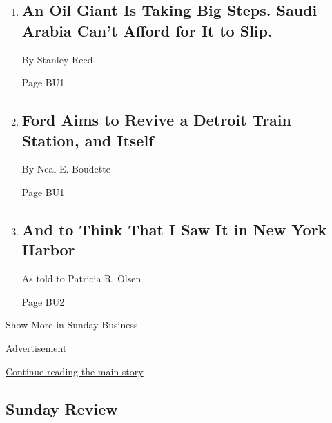 \begin{enumerate}
\def\labelenumi{\arabic{enumi}.}
\item
  \href{/2018/06/16/business/energy-environment/saudi-arabia-aramco.html}{}

  \hypertarget{an-oil-giant-is-taking-big-steps-saudi-arabia-cant-afford-for-it-to-slip}{%
  \subsection{An Oil Giant Is Taking Big Steps. Saudi Arabia Can't
  Afford for It to
  Slip.}\label{an-oil-giant-is-taking-big-steps-saudi-arabia-cant-afford-for-it-to-slip}}

  By Stanley Reed

  Page BU1
\item
  \href{/2018/06/17/business/ford-detroit-station.html}{}

  \hypertarget{ford-aims-to-revive-a-detroit-train-station-and-itself-1}{%
  \subsection{Ford Aims to Revive a Detroit Train Station, and
  Itself}\label{ford-aims-to-revive-a-detroit-train-station-and-itself-1}}

  By Neal E. Boudette

  Page BU1
\item
  \href{/2018/06/15/business/jacobs-diver-new-york.html}{}

  \hypertarget{and-to-think-that-i-saw-it-in-new-york-harbor}{%
  \subsection{And to Think That I Saw It in New York
  Harbor}\label{and-to-think-that-i-saw-it-in-new-york-harbor}}

  As told to Patricia R. Olsen

  Page BU2
\end{enumerate}

Show More in Sunday Business

Advertisement

\protect\hyperlink{after-mid4}{Continue reading the main story}

\hypertarget{sunday-review}{%
\subsection{Sunday Review}\label{sunday-review}}


